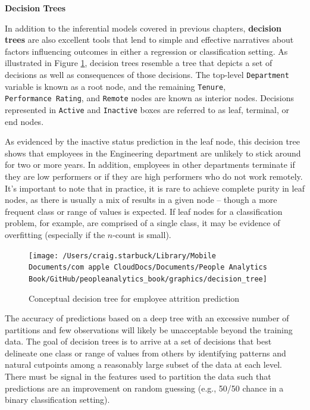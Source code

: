 \documentclass[
]{book}
\begin{document}
\textbf{Decision Trees}

In addition to the inferential models covered in previous chapters, \textbf{decision trees} are also excellent tools that lend to simple and effective narratives about factors influencing outcomes in either a regression or classification setting. As illustrated in Figure \ref{fig:decision-tree}, decision trees resemble a tree that depicts a set of decisions as well as consequences of those decisions. The top-level \texttt{Department} variable is known as a root node, and the remaining \texttt{Tenure}, \texttt{Performance\ Rating}, and \texttt{Remote} nodes are known as interior nodes. Decisions represented in \texttt{Active} and \texttt{Inactive} boxes are referred to as leaf, terminal, or end nodes.

As evidenced by the inactive status prediction in the leaf node, this decision tree shows that employees in the Engineering department are unlikely to stick around for two or more years. In addition, employees in other departments terminate if they are low performers or if they are high performers who do not work remotely. It's important to note that in practice, it is rare to achieve complete purity in leaf nodes, as there is usually a mix of results in a given node -- though a more frequent class or range of values is expected. If leaf nodes for a classification problem, for example, are comprised of a single class, it may be evidence of overfitting (especially if the \(n\)-count is small).

\begin{figure}

{\centering \texttt{[image: /Users/craig.starbuck/Library/Mobile Documents/com~apple~CloudDocs/Documents/People Analytics Book/GitHub/peopleanalytics\_book/graphics/decision\_tree]} 

}

\caption{Conceptual decision tree for employee attrition prediction}\label{fig:decision-tree}
\end{figure}

The accuracy of predictions based on a deep tree with an excessive number of partitions and few observations will likely be unacceptable beyond the training data. The goal of decision trees is to arrive at a set of decisions that best delineate one class or range of values from others by identifying patterns and natural cutpoints among a reasonably large subset of the data at each level. There must be signal in the features used to partition the data such that predictions are an improvement on random guessing (e.g., 50/50 chance in a binary classification setting).
\end{document}
